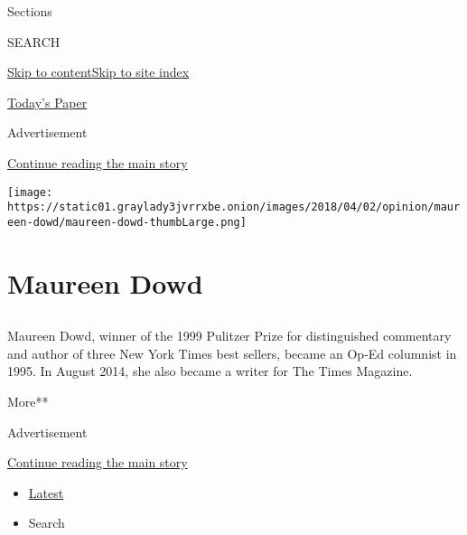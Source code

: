 Sections

SEARCH

\protect\hyperlink{site-content}{Skip to
content}\protect\hyperlink{site-index}{Skip to site index}

\href{https://myaccount.nytimes3xbfgragh.onion/auth/login?response_type=cookie\&client_id=vi}{}

\href{https://www.nytimes3xbfgragh.onion/section/todayspaper}{Today's
Paper}

Advertisement

\protect\hyperlink{after-top}{Continue reading the main story}

\texttt{[image: https://static01.graylady3jvrrxbe.onion/images/2018/04/02/opinion/maureen-dowd/maureen-dowd-thumbLarge.png]}

\hypertarget{maureen-dowd}{%
\section{Maureen Dowd}\label{maureen-dowd}}

\subsection{}

Maureen Dowd, winner of the 1999 Pulitzer Prize for distinguished
commentary and author of three New York Times best sellers, became an
Op-Ed columnist in 1995. In August 2014, she also became a writer for
The Times Magazine.

More**

Advertisement

\protect\hyperlink{after-mid1}{Continue reading the main story}

\begin{itemize}
\tightlist
\item
  \protect\hyperlink{stream-panel}{Latest}
\item
  Search
\end{itemize}

